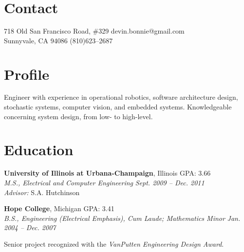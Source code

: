 \documentclass[margin, line]{resume}
\begin{document}
\begin{resume}
\vspace{-2mm}
    \section{\mysidestyle Contact}

	718 Old San Francisco Road, \#329		  \hfill devin.bonnie@gmail.com \\ \vspace{-2mm}%
	Sunnyvale, CA 94086                           \hfill   (810)623--2687 \vspace{0mm}\vspace{-2mm}%
    \section{\mysidestyle Profile}
   
Engineer with experience in operational robotics, software architecture design, stochastic systems, computer vision, and embedded systems. Knowledgeable concerning system design, from low- to high-level.  \vspace{-4mm}
    \section{\mysidestyle Education}

    \textbf{University of Illinois at Urbana-Champaign}, Illinois  \hfill GPA: 3.66 \vspace{0mm}\\%
    \textsl{M.S., Electrical and Computer Engineering} \hfill \textsl{Sept. 2009 -- Dec. 2011}\\
    \textsl{Advisor:} S.A. Hutchinson \vspace{-2mm} %

    \textbf{Hope College}, Michigan  \hfill GPA: 3.41\vspace{0mm}\\%
    \textsl{B.S., Engineering (Electrical Emphasis), Cum Laude; Mathematics Minor} \hfill \textsl{Jan. 2004 -- Dec. 2007}\vspace{-3mm}\\\vspace{-1mm}%
    \begin{list2}
        \item Senior project recognized with the \textit{VanPutten Engineering Design Award}.
    \end{list2}\vspace{-2mm}


\end{resume}
\end{document}
